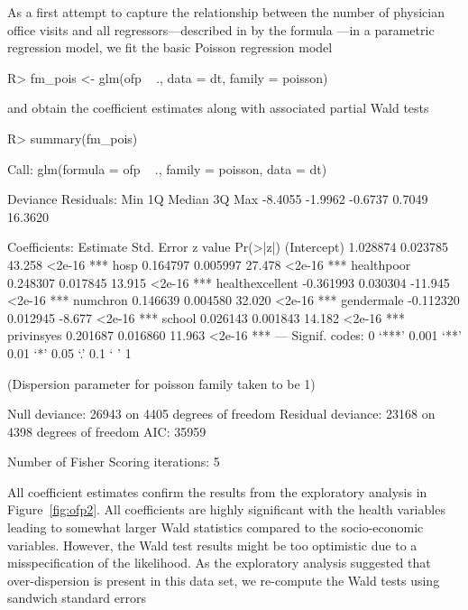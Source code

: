 \documentclass{Z}
\begin{document}
As a first attempt to capture the relationship between the number of 
physician office visits and all regressors---described in  by the
formula ---in a parametric
regression model, we fit the basic Poisson regression model
\begin{Schunk}
\begin{Sinput}
R> fm_pois <- glm(ofp ~ ., data = dt, family = poisson)
\end{Sinput}
\end{Schunk}
and obtain the coefficient estimates along with associated partial Wald tests
\begin{Schunk}
\begin{Sinput}
R> summary(fm_pois)
\end{Sinput}
\begin{Soutput}
Call:
glm(formula = ofp ~ ., family = poisson, data = dt)

Deviance Residuals: 
    Min       1Q   Median       3Q      Max  
-8.4055  -1.9962  -0.6737   0.7049  16.3620  

Coefficients:
                 Estimate Std. Error z value Pr(>|z|)    
(Intercept)      1.028874   0.023785  43.258   <2e-16 ***
hosp             0.164797   0.005997  27.478   <2e-16 ***
healthpoor       0.248307   0.017845  13.915   <2e-16 ***
healthexcellent -0.361993   0.030304 -11.945   <2e-16 ***
numchron         0.146639   0.004580  32.020   <2e-16 ***
gendermale      -0.112320   0.012945  -8.677   <2e-16 ***
school           0.026143   0.001843  14.182   <2e-16 ***
privinsyes       0.201687   0.016860  11.963   <2e-16 ***
---
Signif. codes:  0 ‘***’ 0.001 ‘**’ 0.01 ‘*’ 0.05 ‘.’ 0.1 ‘ ’ 1 

(Dispersion parameter for poisson family taken to be 1)

    Null deviance: 26943  on 4405  degrees of freedom
Residual deviance: 23168  on 4398  degrees of freedom
AIC: 35959

Number of Fisher Scoring iterations: 5
\end{Soutput}
\end{Schunk}
All coefficient estimates confirm the results from the exploratory analysis
in Figure~\ref{fig:ofp2}. All coefficients are highly significant with the
health variables leading to somewhat larger Wald statistics compared to the
socio-economic variables. However, the Wald test
results might be too optimistic due to a misspecification of the likelihood.
As the exploratory analysis suggested that over-dispersion is present in this data
set, we re-compute the Wald tests using sandwich standard errors
\end{document}

